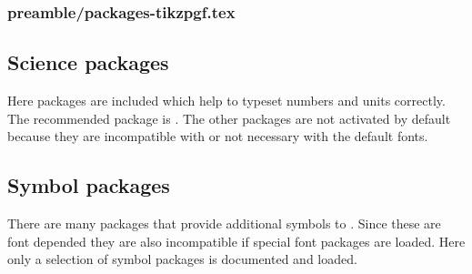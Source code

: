 

\subsubsection{preamble/packages-tikzpgf.tex}


\subsection{Science packages}
\label{sec:packages:science}

Here packages are included which help to typeset numbers and units correctly.
The recommended package is . The other packages are not activated by default because they are incompatible with  or not necessary with the default fonts.



\subsection{Symbol packages}
\label{sec:packages:symbols}

There are many packages that provide additional symbols to \latex . Since these are font depended they are also incompatible if special font packages are loaded. Here only a selection of symbol packages is documented and loaded.

